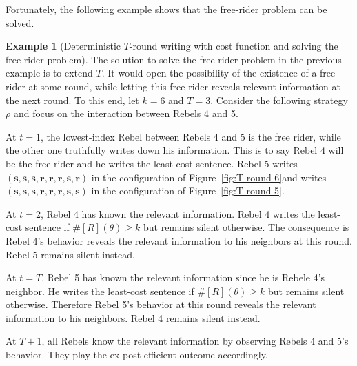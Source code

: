 \documentclass[12pt,letter]{article}
\newcommand\omicron{o}
\theoremstyle{definition}
\newtheorem{example}{Example}
\theoremstyle{remark}
\theoremstyle{claim}
\begin{document}
Fortunately, the following example shows that the free-rider problem can be solved. 

\begin{example}[Deterministic $T$-round writing with cost function and solving the free-rider problem]
\label{ex:cost_function_talk_solve_fr}
The solution to solve the free-rider problem in the previous example is to extend $T$. It would open the possibility of the existence of a free rider at some round, while letting this free rider reveals relevant information at the next round. To this end, let $k=6$ and $T=3$. Consider the following strategy $\rho$ and focus on the interaction between Rebels 4 and 5.

At $t=1$, the lowest-index Rebel between Rebels 4 and 5 is the free rider, while the other one truthfully writes down his information. This is to say Rebel 4 will be the free rider and he writes the least-cost sentence. Rebel 5 writes $(\textbf{s},\textbf{s},\textbf{s},\textbf{r},\textbf{r},\textbf{r},\textbf{s},\textbf{r})$ in the configuration of Figure~\ref{fig:T-round-6}and writes $(\textbf{s},\textbf{s},\textbf{s},\textbf{r},\textbf{r},\textbf{r},\textbf{s},\textbf{s})$ in the configuration of Figure~\ref{fig:T-round-5}. 

At $t=2$, Rebel 4 has known the relevant information. Rebel 4 writes the least-cost sentence if $\#[R](\theta)\geq k$ but remains silent otherwise. The consequence is Rebel 4's behavior reveals the relevant information to his neighbors at this round. Rebel 5 remains silent instead. 

At $t=T$, Rebel 5 has known the relevant information since he is Rebele 4's neighbor. He writes the least-cost sentence if $\#[R](\theta)\geq k$ but remains silent otherwise. Therefore Rebel 5's behavior at this round reveals the relevant information to his neighbors. Rebel 4 remains silent instead.

At $T+1$, all Rebels know the relevant information by observing Rebels 4 and 5's behavior. They play the ex-post efficient outcome accordingly. 



\end{example}
\end{document}
